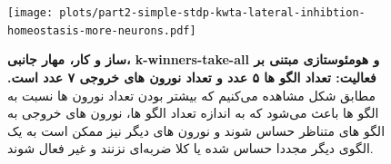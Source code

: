     \begin{figure}[!ht]
        \centering
        \texttt{[image: plots/part2-simple-stdp-kwta-lateral-inhibtion-homeostasis-more-neurons.pdf]} 
        \captionsetup{width=.9\linewidth}
        \caption{\textbf{ ساز و کار، مهار جانبی، 
        k-winners-take-all و 
        هومئوستازی مبتنی بر فعالیت: تعداد الگو ها ۵ عدد و تعداد نورون های خروجی ۷ عدد است.} مطابق شکل مشاهده می‌کنیم که بیشتر بودن تعداد نورون ها نسبت به الگو ها باعث می‌شود که به اندازه تعداد الگو ها، نورون های خروجی به الگو های متناظر حساس شوند و نورون های دیگر نیز ممکن است به یک الگوی دیگر مجددا حساس شده یا کلا ضربه‌ای نزنند و غیر فعال شوند.}
        \label{fig:part2-simple-stdp-kwta-lateral-inhibtion-homeostasis-more-neurons}
    \end{figure}